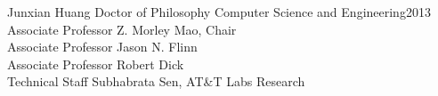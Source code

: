 \documentclass[letterpaper,12pt,oneside]{report}
\begin{document}
{Junxian Huang}
{Doctor of Philosophy}
{Computer Science and Engineering}{2013}
{Associate Professor Z. Morley Mao, Chair \\
Associate Professor Jason N. Flinn \\
Associate Professor Robert Dick \\
Technical Staff Subhabrata Sen, AT\&T Labs Research}


\initializefrontsections




\tableofcontents     %
\listoftables        %
\listoffigures       %




\startthechapters











\begin{singlespace}


\end{singlespace}
\end{document}
